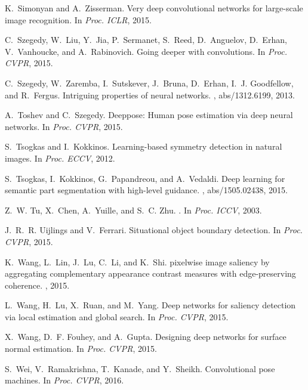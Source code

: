 \documentclass[10pt,twocolumn,letterpaper]{article}
\begin{document}
\begin{thebibliography}{100}
	K.~Simonyan and A.~Zisserman.
	\newblock Very deep convolutional networks for large-scale image recognition.
	\newblock In {\em Proc. {ICLR}}, 2015.
	
	C.~Szegedy, W.~Liu, Y.~Jia, P.~Sermanet, S.~Reed, D.~Anguelov, D.~Erhan,
	V.~Vanhoucke, and A.~Rabinovich.
	\newblock Going deeper with convolutions.
	\newblock In {\em Proc. {CVPR}}, 2015.
	
	C.~Szegedy, W.~Zaremba, I.~Sutskever, J.~Bruna, D.~Erhan, I.~J. Goodfellow, and
	R.~Fergus.
	\newblock Intriguing properties of neural networks.
	, abs/1312.6199, 2013.
	
	A.~Toshev and C.~Szegedy.
	\newblock Deeppose: Human pose estimation via deep neural networks.
	\newblock In {\em Proc. {CVPR}}, 2015.
	
	S.~Tsogkas and I.~Kokkinos.
	\newblock Learning-based symmetry detection in natural images.
	\newblock In {\em Proc. {ECCV}}, 2012.
	
	S.~Tsogkas, I.~Kokkinos, G.~Papandreou, and A.~Vedaldi.
	\newblock Deep learning for semantic part segmentation with high-level
	guidance.
	, abs/1505.02438, 2015.
	
	Z.~W. Tu, X.~Chen, A.~Yuille, and S.~C. Zhu.
	.
	\newblock In {\em Proc. {ICCV}}, 2003.
	
	J.~R.~R. Uijlings and V.~Ferrari.
	\newblock Situational object boundary detection.
	\newblock In {\em Proc. {CVPR}}, 2015.
	
	K.~Wang, L.~Lin, J.~Lu, C.~Li, and K.~Shi.
	 pixelwise image saliency by aggregating complementary
	appearance contrast measures with edge-preserving coherence.
	, 2015.
	
	L.~Wang, H.~Lu, X.~Ruan, and M.~Yang.
	\newblock Deep networks for saliency detection via local estimation and global
	search.
	\newblock In {\em Proc. {CVPR}}, 2015.
	
	X.~Wang, D.~F. Fouhey, and A.~Gupta.
	\newblock Designing deep networks for surface normal estimation.
	\newblock In {\em Proc. {CVPR}}, 2015.
	
	S.~Wei, V.~Ramakrishna, T.~Kanade, and Y.~Sheikh.
	\newblock Convolutional pose machines.
	\newblock In {\em Proc. {CVPR}}, 2016.
	

\end{thebibliography}
\end{document}
